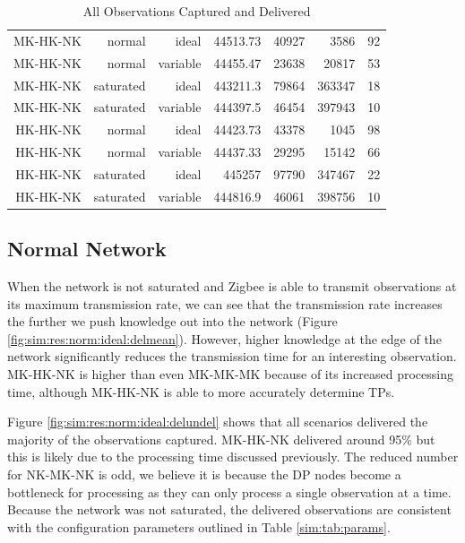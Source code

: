 \begin{landscape}
\begin{table}[htbp]
\begin{tabular}{rrrrrrr}
\rowcolor{Gray}
    MK-HK-NK & normal & ideal & 44513.73 & 40927 & 3586  & 92 \\
\rowcolor{Gray}
    MK-HK-NK & normal & variable & 44455.47 & 23638 & 20817 & 53 \\
\rowcolor{Gray}
    MK-HK-NK & saturated & ideal & 443211.3 & 79864 & 363347 & 18 \\
\rowcolor{Gray}
    MK-HK-NK & saturated & variable & 444397.5 & 46454 & 397943 & 10 \\
    HK-HK-NK & normal & ideal & 44423.73 & 43378 & 1045  & 98 \\
    HK-HK-NK & normal & variable & 44437.33 & 29295 & 15142 & 66 \\
    HK-HK-NK & saturated & ideal & 445257 & 97790 & 347467 & 22 \\
    HK-HK-NK & saturated & variable & 444816.9 & 46061 & 398756 & 10 \\
    \bottomrule

    \end{tabular}%
    \caption{All Observations Captured and Delivered}
\end{table}%
\label{tab:delnum}%
\end{landscape}

\subsection{Normal Network}

When the network is not saturated and Zigbee is able to transmit observations at its maximum transmission rate, we can see that the transmission rate increases the further we push knowledge out into the network (Figure \ref{fig:sim:res:norm:ideal:delmean}). However, higher knowledge at the edge of the network significantly reduces the transmission time for an interesting observation. MK-HK-NK is higher than even MK-MK-MK because of its increased processing time, although MK-HK-NK is able to more accurately determine TPs.

Figure \ref{fig:sim:res:norm:ideal:delundel} shows that all scenarios delivered the majority of the observations captured. MK-HK-NK delivered around 95\% but this is likely due to the processing time discussed previously. The reduced number for NK-MK-NK is odd, we believe it is because the DP nodes become a bottleneck for processing as they can only process a single observation at a time. Because the network was not saturated, the delivered observations are consistent with the configuration parameters outlined in Table \ref{sim:tab:params}.

